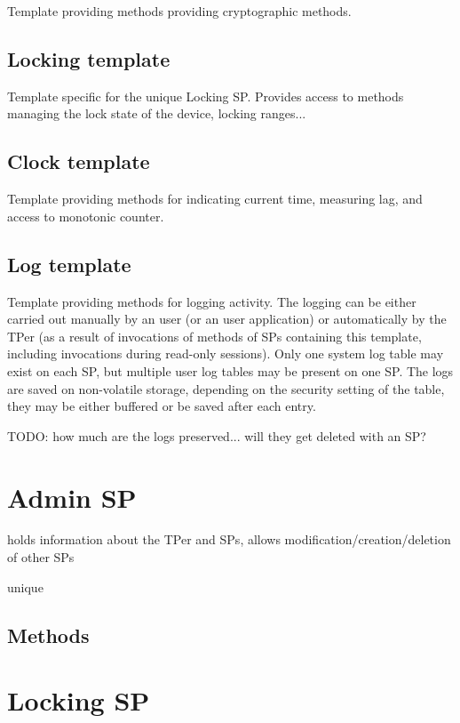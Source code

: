 Template providing methods providing cryptographic methods.

\subsection{Locking template}

Template specific for the unique Locking SP. Provides access to methods managing the lock state of the device, locking ranges...

\subsection{Clock template}

Template providing methods for indicating current time, measuring lag, and access to monotonic counter. 

\subsection{Log template}

Template providing methods for logging activity. The logging can be either carried out manually by an user (or an user application) or automatically by the TPer (as a result of invocations of methods of SPs containing this template, including invocations during read-only sessions). 
Only one system log table may exist on each SP, but multiple user log tables may be present on one SP.
The logs are saved on non-volatile storage, depending on the security setting of the table, they may be either buffered or be saved after each entry.

TODO: how much are the logs preserved... will they get deleted with an SP?

\section{Admin SP}

holds information about the TPer and SPs, allows modification/creation/deletion of other SPs

unique

\subsection{Methods}

\section{Locking SP}

